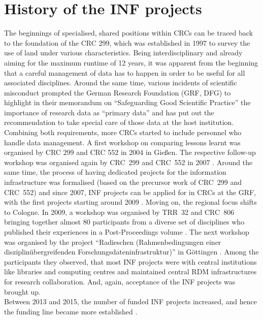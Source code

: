 \documentclass{eceasst}
\begin{document}
\section{History of the INF projects}
\label{sec:history}
The beginnings of specialised, shared positions within CRCs can be traced back to the foundation of the CRC 299, which was established in 1997 to survey the use of land under various characteristics.
Being interdisciplinary and already aiming for the maximum runtime of 12 years, it was apparent from the beginning \cite{mueckschel2006} that a careful management of data has to happen in order to be useful for all associated disciplines.
Around the same time, various incidents of scientific misconduct prompted the German Research Foundation (GRF, DFG) to highlight in their
memorandum on ``Safeguarding Good Scientific Practice'' \cite{DFG1998}
the importance of research data as ``primary data''  and has put out the recommendation to take special care of those data at the host institution.
Combining both requirements, more CRCs started to include personnel who handle data management.
A first workshop \cite{SFB299-2004, SFB299-2005} on comparing lessons learnt was organised by CRC 299 and CRC 552 in 2004 in Gießen.
The respective follow-up workshop was organised again by CRC~299 and CRC~552 in 2007 \cite{SFB299-2007}.
Around the same time, the process of having dedicated projects for the information infrastructure was formalised (based on the precursor work of CRC~299 and CRC~552)
and since 2007, INF projects can be applied for in CRCs at the GRF, with the first projects starting around 2009 \cite{Forschungsdateninfrastruktur2013}.
Moving on, the regional focus shifts to Cologne.
In 2009, a workshop was organised by TRR~32 and CRC~806 bringing together almost 80 participants from a diverse set of disciplines who published their experiences in a
Post-Proceedings volume \cite{curdt787}.
The next workshop was organised by the project ``Radieschen (Rahmenbedingungen einer disziplinübergreifenden Forschungsdateninfrastruktur)''
in Göttingen \cite{Forschungsdateninfrastruktur2013}.
Among the participants they observed, that most INF projects were with central institutions like libraries and computing centres and maintained central
RDM infrastructures for research collaboration. And, again, acceptance of the INF projects was brought up.\\
Between 2013 and 2015, the number of funded INF projects increased, and hence the funding line became more established \cite{Engelhardt2013Forschungsdatenmanagement, bastian_2025}.
\end{document}
